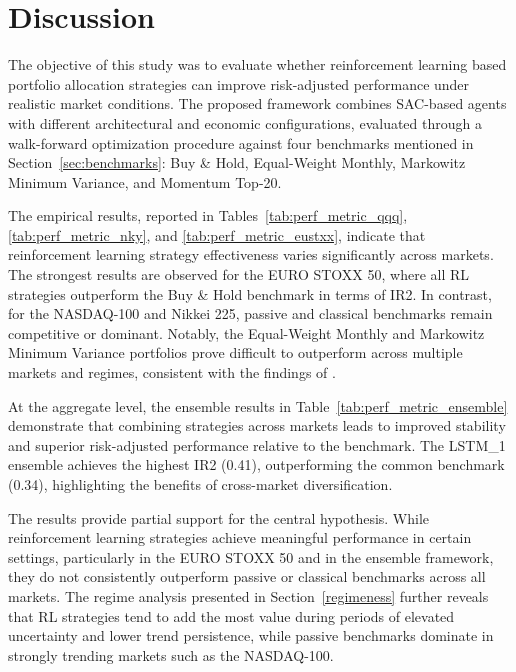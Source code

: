 \documentclass[]{elsarticle}
\begin{document}
\linespread{1.5}\selectfont

\hypertarget{discussion}{%
\section{Discussion}\label{discussion}}

The objective of this study was to evaluate whether reinforcement learning based portfolio allocation strategies can improve risk-adjusted performance under realistic market conditions. The proposed framework combines SAC-based agents with different architectural and economic configurations, evaluated through a walk-forward optimization procedure against four benchmarks mentioned in Section~\ref{sec:benchmarks}: Buy \& Hold, Equal-Weight Monthly, Markowitz Minimum Variance, and Momentum Top-20.

The empirical results, reported in Tables~\ref{tab:perf_metric_qqq}, \ref{tab:perf_metric_nky}, and \ref{tab:perf_metric_eustxx}, indicate that reinforcement learning strategy effectiveness varies significantly across markets. The strongest results are observed for the EURO STOXX 50, where all RL strategies outperform the Buy \& Hold benchmark in terms of IR2. In contrast, for the NASDAQ-100 and Nikkei 225, passive and classical benchmarks remain competitive or dominant. Notably, the Equal-Weight Monthly and Markowitz Minimum Variance portfolios prove difficult to outperform across multiple markets and regimes, consistent with the findings of \citet{DE_MIGEUL}.

At the aggregate level, the ensemble results in Table~\ref{tab:perf_metric_ensemble} demonstrate that combining strategies across markets leads to improved stability and superior risk-adjusted performance relative to the benchmark. The LSTM\_1 ensemble achieves the highest IR2 (0.41), outperforming the common benchmark (0.34), highlighting the benefits of cross-market diversification.

The results provide partial support for the central hypothesis. While reinforcement learning strategies achieve meaningful performance in certain settings, particularly in the EURO STOXX 50 and in the ensemble framework, they do not consistently outperform passive or classical benchmarks across all markets. The regime analysis presented in Section~\ref{regimeness} further reveals that RL strategies tend to add the most value during periods of elevated uncertainty and lower trend persistence, while passive benchmarks dominate in strongly trending markets such as the NASDAQ-100.
\end{document}

